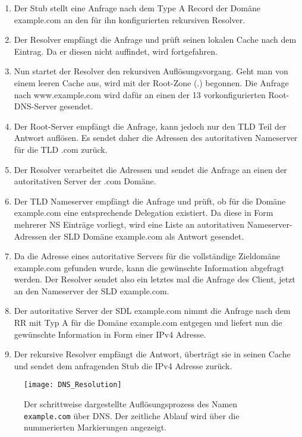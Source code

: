 \begin{enumerate}
    \item Der Stub stellt eine Anfrage nach dem Type A Record der Domäne example.com an den für ihn konfigurierten rekursiven Resolver.
    \item Der Resolver empfängt die Anfrage und prüft seinen lokalen Cache nach dem Eintrag. Da er diesen nicht auffindet, wird fortgefahren.
    \item Nun startet der Resolver den rekursiven Auflösungsvorgang. Geht man von einem leeren Cache aus, wird mit der Root-Zone (.) begonnen. Die Anfrage nach www.example.com wird dafür an einen der 13 vorkonfigurierten Root-DNS-Server gesendet.
    \item Der Root-Server empfängt die Anfrage, kann jedoch nur den TLD Teil der Antwort auflösen. Es sendet daher die Adressen des autoritativen Nameserver für die TLD .com zurück.
    \item Der Resolver verarbeitet die Adressen und sendet die Anfrage an einen der autoritativen Server der .com Domäne.
    \item Der TLD Nameserver empfängt die Anfrage und prüft, ob für die Domäne example.com eine entsprechende Delegation existiert. Da diese in Form mehrerer NS Einträge vorliegt, wird eine Liste an autoritativen Nameserver-Adressen der SLD Domäne example.com als Antwort gesendet.
    \item Da die Adresse eines autoritative Servers für die vollständige Zieldomäne example.com gefunden wurde, kann die gewünschte Information abgefragt werden. Der Resolver sendet also ein letztes mal die Anfrage des Client, jetzt an den Nameserver der SLD example.com.
    \item Der autoritative Server der SDL example.com nimmt die Anfrage nach dem RR mit Typ A für die Domäne example.com entgegen und liefert nun die gewünschte Information in Form einer IPv4 Adresse.
    \item Der rekursive Resolver empfängt die Antwort, überträgt sie in seinen Cache und sendet dem anfragenden Stub die IPv4 Adresse zurück.
\end{enumerate}

\begin{figure}[htbp]
    \centering
    \texttt{[image: DNS\_Resolution]}
    \caption{Der schrittweise dargestellte Auflösungsprozess des Namen \texttt{example.com} über DNS. Der zeitliche Ablauf wird über die nummerierten Markierungen angezeigt.}
    \label{img:dnsresolution}
\end{figure}

